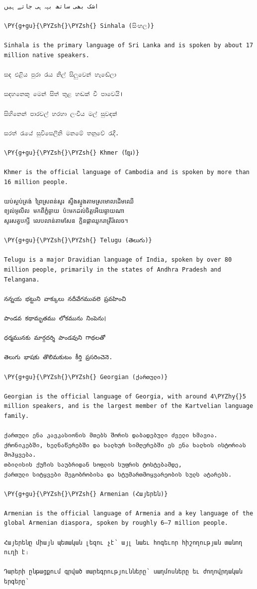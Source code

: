 \documentclass[a4paper,twoside]{article}
\begin{document}
\begin{tscode}[lang=markdown, engine=pygments]
\begin{Verbatim}[commandchars=\\\{\},breaklines, breakanywhere, commandchars=\\\{\}]
اشک بھی ساتھ بہہ ہی جاتے ہیں

\PY{g+gu}{\PYZsh{}\PYZsh{} Sinhala (සිංහල)}

Sinhala is the primary language of Sri Lanka and is spoken by about 17 million native speakers.

සඳ එළිය පුරා රැය නිල් සිලුවෙන් හැඬේලා

සඳහනෙකු මෙන් සිත් තුළ හඬක් වී පාවෙයි।

සිහිනෙන් පාරවල් හරහා ලංවීය මල් සුවඳක්

සරත් රැයේ සුවිසෙලිනි මනමේ තනුවේ රැදී.

\PY{g+gu}{\PYZsh{}\PYZsh{} Khmer (ខ្មែរ)}

Khmer is the official language of Cambodia and is spoken by more than 16 million people.

យប់ស្ថប់ត្រង់ ព្រៃស្រពន់សូរ ស្ទឹងស្ទូងតាមស្រមោលដើមឈើ
ខ្យល់អូលីល មកពីភ្នំឆ្ងាយ ប៉ះមកដល់ចិត្តអើយឆ្ងាយណា
សូរសត្វបក្សី លេបលាន់តាមសែន ក្លិនផ្កាឈូករាត្រីរំលេច។

\PY{g+gu}{\PYZsh{}\PYZsh{} Telugu (తెలుగు)}

Telugu is a major Dravidian language of India, spoken by over 80 million people, primarily in the states of Andhra Pradesh and Telangana.

నన్నయ భట్టుని వాక్కులు నదీవేగమువలె ప్రవహించి

పాండవ కథామృతము లోకమును నింపెను।

ధర్మమునకు మార్గదర్శి పాండవుని గాథలతో

తెలుగు భాషకు తొలిమకుటం కీర్తి ప్రసరించెనె.

\PY{g+gu}{\PYZsh{}\PYZsh{} Georgian (ქართული)}

Georgian is the official language of Georgia, with around 4\PYZhy{}5 million speakers, and is the largest member of the Kartvelian language family.

ქართული ენა კავკასიონის მთებს შორის დაბადებული ძველი ხმავია.
ქრონიკებში, ხელნაწერებში და ხალხურ სიმღერებში ეს ენა ხალხის ისტორიას მოჰყვება.
თბილისის ქუჩის საუბრიდან სოფლის სუფრის ტოსტებამდე,
ქართული სიტყვები მეგობრობისა და სტუმართმოყვარეობის სულს ატარებს.

\PY{g+gu}{\PYZsh{}\PYZsh{} Armenian (Հայերեն)}

Armenian is the official language of Armenia and a key language of the global Armenian diaspora, spoken by roughly 6–7 million people.

Հայերենը միայն պետական լեզու չէ՝ այլ նաեւ հոգեւոր հիշողության տանող ուղի է։

Դարերի ընթացքում գրված տարեգրությունները՝ սաղմոսները եւ ժողովրդական երգերը՝


\end{Verbatim}
\end{tscode}
\end{document}
